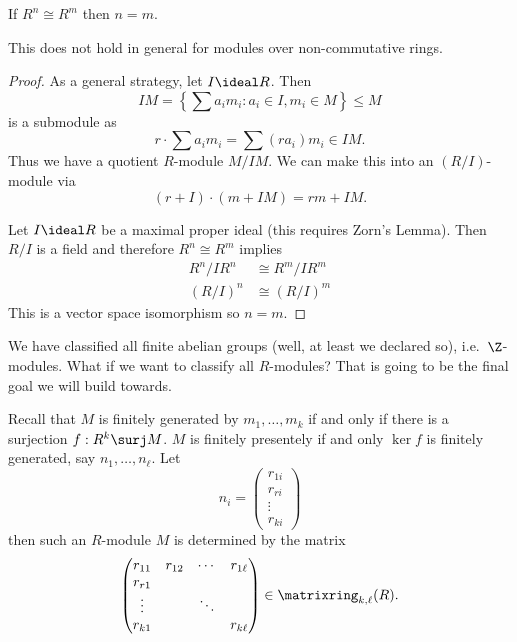 \documentclass[a4paper]{article}
\begin{document}
\begin{proposition}
  If \(R^n \cong R^m\) then \(n = m\).
\end{proposition}

\begin{note}
  This does not hold in general for modules over non-commutative rings.
\end{note}

\begin{proof}
  As a general strategy, let \(I \ideal R\). Then
  \[
    IM = \left\{\sum a_im_i: a_i \in I, m_i \in M \right\} \leq M
  \]
  is a submodule as
  \[
    r \cdot \sum a_im_i = \sum (ra_i)m_i \in IM.
  \]
  Thus we have a quotient \(R\)-module \(M/IM\). We can make this into an \((R/I)\)-module via
  \[
    (r + I) \cdot (m + IM) = rm + IM.
  \]

  Let \(I \ideal R\) be a maximal proper ideal (this requires Zorn's Lemma). Then \(R/I\) is a field and therefore \(R^n \cong R^m\) implies
  \begin{align*}
    R^n/IR^n &\cong R^m/IR^m \\
    (R/I)^n &\cong (R/I)^m
  \end{align*}
  This is a vector space isomorphism so \(n = m\).
\end{proof}

We have classified all finite abelian groups (well, at least we declared so), i.e.\ \(\Z\)-modules. What if we want to classify all \(R\)-modules? That is going to be the final goal we will build towards.

Recall that \(M\) is finitely generated by \(m_1, \dots, m_k\) if and only if there is a surjection \(f: R^k \surj M\). \(M\) is finitely presentely if and only \(\ker f\) is finitely generated, say \(n_1, \dots, n_\ell\). Let
\[
  n_i =
  \begin{pmatrix}
    r_{1i} \\
    r_{ri} \\
    \vdots \\
    r_{ki}
  \end{pmatrix}
\]
then such an \(R\)-module \(M\) is determined by the matrix
\[
  \begin{pmatrix}
    r_{11} & r_{12} & \cdots & r_{1\ell} \\
    r_{r1} & & & \\
    \vdots & & \ddots & \\
    r_{k1} & & & r_{k\ell}
  \end{pmatrix}
  \in \matrixring_{k, \ell}(R).
\]
\end{document}
